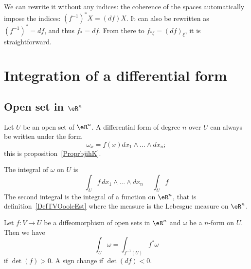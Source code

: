 We can rewrite it without  any indices: the coherence of the spaces automatically impose the indices: $(f^{-1})^*X=(df)X$. It can also be rewritten as $(f^{-1})^*=df$, and thus $f_*=df$. From there to $f_{* \xi}=(df)_{\xi}$, it is straightforward.


\section{Integration of a differential form}

\subsection{Open set in \( \eR^n\)}

Let \( U\) be an open set of \( \eR^n\). A differential form of degree \( n\) over \( U\) can always be written under the form
\begin{equation}
    \omega_x=f(x)dx_1\wedge\ldots\wedge dx_n;
\end{equation}
this is proposition~\ref{ProprbjihK}.

\begin{definition}      \label{DEFooEYRFooRQTmRF}
    The integral of \( \omega\) on \( U\) is
    \begin{equation}
        \int_{U}f\,dx_1\wedge\ldots\wedge dx_n=\int_Uf
    \end{equation}
    The second integral is the integral of a function on \( \eR^n\), that is definition~\ref{DefTVOooleEst} where the measure is the Lebesgue measure on \( \eR^n\).
\end{definition}

\begin{lemma}       \label{LEMooNCYSooXtnCKq}
    Let \( f\colon V\to U\) be a diffeomorphism of open sets in \( \eR^n\) and \( \omega\) be a \( n\)-form on \( U\). Then we have
    \begin{equation}
        \int_U\omega=\int_{f^{-1}(U)}f^*\omega
    \end{equation}
    if \( \det(f)>0\). A sign change if \( \det(df)<0\).
\end{lemma}

